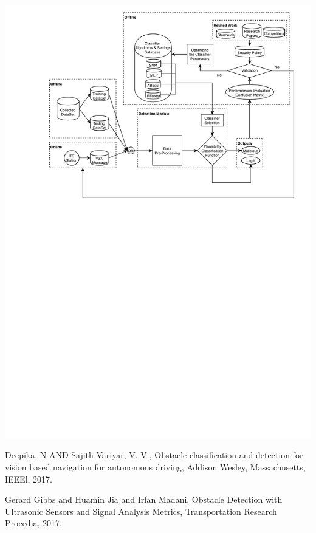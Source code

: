 \documentclass[a4paper]{report}
\begin{document}
\begin{center}
   \includegraphics[width=\textwidth]{MLFramework.pdf}
\end{center}

\begin{thebibliography}{9}
          Deepika, N AND Sajith Variyar, V. V.,
          Obstacle classification and detection for vision based navigation for autonomous driving,
          Addison Wesley, Massachusetts,
          IEEEl,
          2017.
     
         
          Gerard Gibbs and Huamin Jia and Irfan Madani,
          Obstacle Detection with Ultrasonic Sensors and Signal Analysis Metrics,
          Transportation Research Procedia,
          2017.
          
\end{thebibliography}
\end{document}
